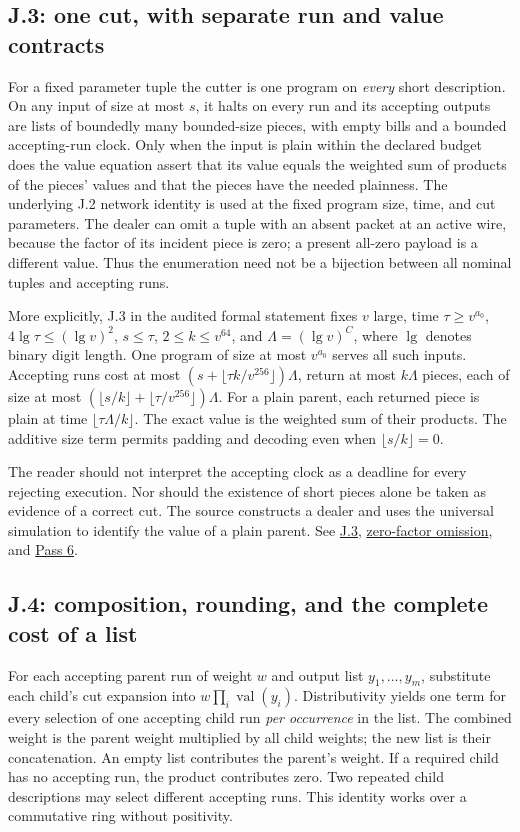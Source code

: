 \documentclass[11pt,letterpaper]{article}
\theoremstyle{definition}\newtheorem{definition}[theorem]{Definition}\newtheorem{example}[theorem]{Example}
\theoremstyle{remark}\newtheorem{remark}[theorem]{Remark}
\newcommand{\pub}[3]{\href{https://github.com/anthropics/formal-math/blob/11b6c7e3c927df2658f513b6b68ea7f8929c62c5/vp-vnp/#1\#L#2}{#3}}
\newcommand{\aud}[2]{\href{https://github.com/nousentllc/VP-VNP-Review/blob/567303d0bcf4f9d54390437b137752446e58ccd6/#1}{#2}}
\begin{document}
\subsection{J.3: one cut, with separate run and value contracts}\label{sec:onecut}
For a fixed parameter tuple the cutter is one program on \emph{every} short description. On any input of size at most $s$, it halts on every run and its accepting outputs are lists of boundedly many bounded-size pieces, with empty bills and a bounded accepting-run clock. Only when the input is plain within the declared budget does the value equation assert that its value equals the weighted sum of products of the pieces' values and that the pieces have the needed plainness. The underlying J.2 network identity is used at the fixed program size, time, and cut parameters. The dealer can omit a tuple with an absent packet at an active wire, because the factor of its incident piece is zero; a present all-zero payload is a different value. Thus the enumeration need not be a bijection between all nominal tuples and accepting runs.

More explicitly, J.3 in the audited formal statement fixes $v$ large, time $\tau\ge v^{a_0}$, $4\lg\tau\le(\lg v)^2$, $s\le\tau$, $2\le k\le v^{64}$, and $\Lambda=(\lg v)^C$, where $\lg$ denotes binary digit length. One program of size at most $v^{a_0}$ serves all such inputs. Accepting runs cost at most $(s+\lfloor\tau k/v^{256}\rfloor)\Lambda$, return at most $k\Lambda$ pieces, each of size at most $(\lfloor s/k\rfloor+\lfloor\tau/v^{256}\rfloor)\Lambda$. For a plain parent, each returned piece is plain at time $\lfloor\tau\Lambda/k\rfloor$. The exact value is the weighted sum of their products. The additive size term permits padding and decoding even when $\lfloor s/k\rfloor=0$.

The reader should not interpret the accepting clock as a deadline for every rejecting execution. Nor should the existence of short pieces alone be taken as evidence of a correct cut. The source constructs a dealer and uses the universal simulation to identify the value of a plain parent. See \pub{Paper/Cuts.lean}{101}{J.3}, \pub{Nc/Dl/Cut.lean}{239}{zero-factor omission}, and \aud{passes/06-one-cut-and-iteration.md}{Pass 6}.

\subsection{J.4: composition, rounding, and the complete cost of a list}\label{sec:cut}
For each accepting parent run of weight $w$ and output list $y_1,\ldots,y_m$, substitute each child's cut expansion into $w\prod_i\operatorname{val}(y_i)$. Distributivity yields one term for every selection of one accepting child run \emph{per occurrence} in the list. The combined weight is the parent weight multiplied by all child weights; the new list is their concatenation. An empty list contributes the parent's weight. If a required child has no accepting run, the product contributes zero. Two repeated child descriptions may select different accepting runs. This identity works over a commutative ring without positivity.
\end{document}
